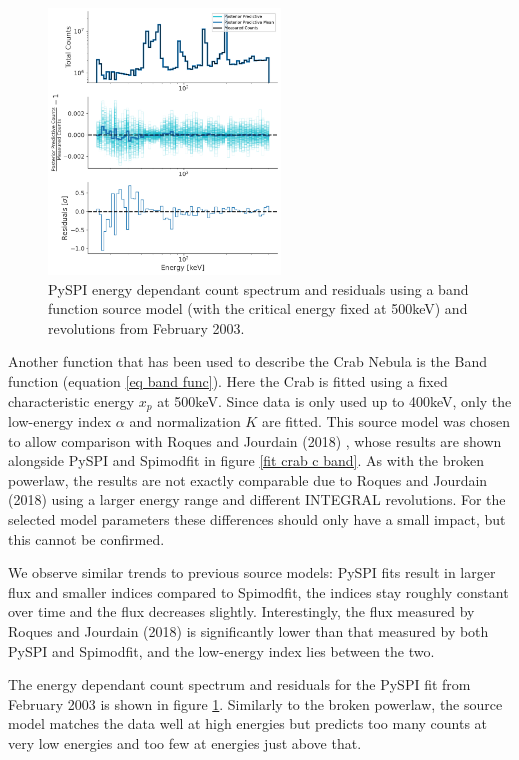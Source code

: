 \documentclass{report}
\begin{document}
\begin{figure}[h]
  \centering
  \includegraphics[width=0.55\textwidth]{Images/Crab_Fits/energy_residual_plot_lower_band.pdf}
  \caption{PySPI energy dependant count spectrum and residuals using a band function source model (with the critical energy fixed at 500keV) and revolutions from February 2003.}
  \label{fig res band}
\end{figure}

Another function that has been used to describe the Crab Nebula is the Band function (equation \ref{eq band func}). Here the Crab is fitted using a fixed characteristic energy $x_p$ at 500keV. Since data is only used up to 400keV, only the low-energy index $\alpha$ and normalization $K$ are fitted. This source model was chosen to allow comparison with Roques and Jourdain (2018) \cite{Roques}, whose results are shown alongside PySPI and Spimodfit in figure \ref{fit crab c band}. As with the broken powerlaw, the results are not exactly comparable due to Roques and Jourdain (2018) \cite{Roques} using a larger energy range and different INTEGRAL revolutions. For the selected model parameters these differences should only have a small impact, but this cannot be confirmed.

We observe similar trends to previous source models: PySPI fits result in larger flux and smaller indices compared to Spimodfit, the indices stay roughly constant over time and the flux decreases slightly. Interestingly, the flux measured by Roques and Jourdain (2018) \cite{Roques} is significantly lower than that measured by both PySPI and Spimodfit, and the low-energy index lies between the two.

The energy dependant count spectrum and residuals for the PySPI fit from February 2003 is shown in figure \ref{fig res band}. Similarly to the broken powerlaw, the source model matches the data well at high energies but predicts too many counts at very low energies and too few at energies just above that. 
\end{document}
